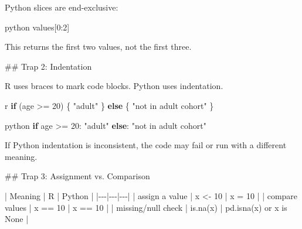 \documentclass[
  letterpaper,
  DIV=11,
  numbers=noendperiod,
  oneside]{scrreprt}
\newenvironment{Shaded}{\begin{snugshade}}{\end{snugshade}}
\newcommand{\CommentTok}[1]{\textcolor[rgb]{0.37,0.37,0.37}{#1}}
\newcommand{\ControlFlowTok}[1]{\textcolor[rgb]{0.00,0.23,0.31}{\textbf{#1}}}
\newcommand{\DecValTok}[1]{\textcolor[rgb]{0.68,0.00,0.00}{#1}}
\newcommand{\FunctionTok}[1]{\textcolor[rgb]{0.28,0.35,0.67}{#1}}
\newcommand{\InformationTok}[1]{\textcolor[rgb]{0.37,0.37,0.37}{#1}}
\newcommand{\NormalTok}[1]{\textcolor[rgb]{0.00,0.23,0.31}{#1}}
\newcommand{\OperatorTok}[1]{\textcolor[rgb]{0.37,0.37,0.37}{#1}}
\newcommand{\PreprocessorTok}[1]{\textcolor[rgb]{0.68,0.00,0.00}{#1}}
\newcommand{\SpecialCharTok}[1]{\textcolor[rgb]{0.37,0.37,0.37}{#1}}
\newcommand{\StringTok}[1]{\textcolor[rgb]{0.13,0.47,0.30}{#1}}
\begin{document}
\begin{Shaded}
\begin{Highlighting}[numbers=left,,]
\NormalTok{Python slices are end{-}exclusive:}

\InformationTok{\textasciigrave{}\textasciigrave{}\textasciigrave{}python}
\NormalTok{values[}\DecValTok{0}\NormalTok{:}\DecValTok{2}\NormalTok{]}
\InformationTok{\textasciigrave{}\textasciigrave{}\textasciigrave{}}

\NormalTok{This returns the first two values, not the first three.}

\FunctionTok{\#\# Trap 2: Indentation}

\NormalTok{R uses braces to mark code blocks. Python uses indentation.}

\InformationTok{\textasciigrave{}\textasciigrave{}\textasciigrave{}r}
\ControlFlowTok{if}\NormalTok{ (age }\SpecialCharTok{\textgreater{}=} \DecValTok{20}\NormalTok{) \{}
  \StringTok{"adult"}
\NormalTok{\} }\ControlFlowTok{else}\NormalTok{ \{}
  \StringTok{"not in adult cohort"}
\NormalTok{\}}
\InformationTok{\textasciigrave{}\textasciigrave{}\textasciigrave{}}

\InformationTok{\textasciigrave{}\textasciigrave{}\textasciigrave{}python}
\ControlFlowTok{if}\NormalTok{ age }\OperatorTok{\textgreater{}=} \DecValTok{20}\NormalTok{:}
    \CommentTok{"adult"}
\ControlFlowTok{else}\NormalTok{:}
    \CommentTok{"not in adult cohort"}
\InformationTok{\textasciigrave{}\textasciigrave{}\textasciigrave{}}

\NormalTok{If Python indentation is inconsistent, the code may fail or run with a different meaning.}

\FunctionTok{\#\# Trap 3: Assignment vs. Comparison}

\PreprocessorTok{|}\NormalTok{ Meaning }\PreprocessorTok{|}\NormalTok{ R }\PreprocessorTok{|}\NormalTok{ Python }\PreprocessorTok{|}
\PreprocessorTok{|{-}{-}{-}|{-}{-}{-}|{-}{-}{-}|}
\PreprocessorTok{|}\NormalTok{ assign a value }\PreprocessorTok{|} \InformationTok{\textasciigrave{}x \textless{}{-} 10\textasciigrave{}} \PreprocessorTok{|} \InformationTok{\textasciigrave{}x = 10\textasciigrave{}} \PreprocessorTok{|}
\PreprocessorTok{|}\NormalTok{ compare values }\PreprocessorTok{|} \InformationTok{\textasciigrave{}x == 10\textasciigrave{}} \PreprocessorTok{|} \InformationTok{\textasciigrave{}x == 10\textasciigrave{}} \PreprocessorTok{|}
\PreprocessorTok{|}\NormalTok{ missing/null check }\PreprocessorTok{|} \InformationTok{\textasciigrave{}is.na(x)\textasciigrave{}} \PreprocessorTok{|} \InformationTok{\textasciigrave{}pd.isna(x)\textasciigrave{}}\NormalTok{ or }\InformationTok{\textasciigrave{}x is None\textasciigrave{}} \PreprocessorTok{|}


\end{Highlighting}
\end{Shaded}
\end{document}
